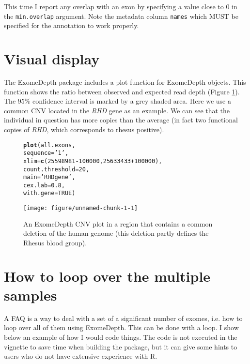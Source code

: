 \documentclass[10pt]{article}\usepackage[]{graphicx}\usepackage[]{color}
\makeatletter
\def\maxwidth{ %
  \ifdim\Gin@nat@width>\linewidth
    \linewidth
  \else
    \Gin@nat@width
  \fi
}
\newcommand{\hlnum}[1]{\textcolor[rgb]{0.686,0.059,0.569}{#1}}%
\newcommand{\hlstr}[1]{\textcolor[rgb]{0.192,0.494,0.8}{#1}}%
\newcommand{\hlopt}[1]{\textcolor[rgb]{0,0,0}{#1}}%
\newcommand{\hlstd}[1]{\textcolor[rgb]{0.345,0.345,0.345}{#1}}%
\newcommand{\hlkwc}[1]{\textcolor[rgb]{0.333,0.667,0.333}{#1}}%
\newcommand{\hlkwd}[1]{\textcolor[rgb]{0.737,0.353,0.396}{\textbf{#1}}}%
\newenvironment{kframe}{%
 \def\at@end@of@kframe{}%
 \ifinner\ifhmode%
  \def\at@end@of@kframe{\end{minipage}}%
  \begin{minipage}{\columnwidth}%
 \fi\fi%
 \def\FrameCommand##1{\hskip\@totalleftmargin \hskip-\fboxsep
 \colorbox{shadecolor}{##1}\hskip-\fboxsep
     \hskip-\linewidth \hskip-\@totalleftmargin \hskip\columnwidth}%
 \MakeFramed {\advance\hsize-\width
   \@totalleftmargin\z@ \linewidth\hsize
   \@setminipage}}%
 {\par\unskip\endMakeFramed%
 \at@end@of@kframe}
\newenvironment{knitrout}{}{} %
\makeatother
\begin{document}
This time I report any overlap with an exon by specifying a value close to 0 in the \texttt{min.overlap} argument.
Note the metadata column \texttt{names} which MUST be specified for the annotation to work properly.





\section{Visual display}

The ExomeDepth package includes a plot function for ExomeDepth objects. This function shows the ratio between observed and expected read depth (Figure \ref{RHD.fig}).
The 95\% confidence interval is marked by a grey shaded area.
Here we use a common CNV located in the {\it RHD} gene as an example. 
We can see that the individual in question has more copies than the average (in fact two functional copies of {\it RHD}, which corresponds to rhesus positive).

\begin{figure}[!htb]
\begin{knitrout}
\color{fgcolor}\begin{kframe}
\begin{alltt}
\hlkwd{plot} \hlstd{(all.exons,}
      \hlkwc{sequence} \hlstd{=} \hlstr{'1'}\hlstd{,}
      \hlkwc{xlim} \hlstd{=} \hlkwd{c}\hlstd{(}\hlnum{25598981} \hlopt{-} \hlnum{100000}\hlstd{,} \hlnum{25633433} \hlopt{+} \hlnum{100000}\hlstd{),}
      \hlkwc{count.threshold} \hlstd{=} \hlnum{20}\hlstd{,}
      \hlkwc{main} \hlstd{=} \hlstr{'RHD gene'}\hlstd{,}
      \hlkwc{cex.lab} \hlstd{=} \hlnum{0.8}\hlstd{,}
      \hlkwc{with.gene} \hlstd{=} \hlnum{TRUE}\hlstd{)}
\end{alltt}


{\ttfamily\noindent\itshape\color{messagecolor}{\#\# Plotting the gene data}}\end{kframe}
\texttt{[image: figure/unnamed-chunk-1-1]} 

\end{knitrout}
\caption{An ExomeDepth CNV plot in a region that contains a common deletion of the human genome (this deletion partly defines the Rhesus blood group).}
\label{RHD.fig}
\end{figure}

\clearpage

\section{How to loop over the multiple samples}
A FAQ is a way to deal with a set of a significant number of exomes, i.e. how to loop over all of them using ExomeDepth.
This can be done with a loop.
I show below an example of how I would code things.
The code is not executed in the vignette to save time when building the package, but it can give some hints to users who do not have extensive experience with R.
\end{document}
